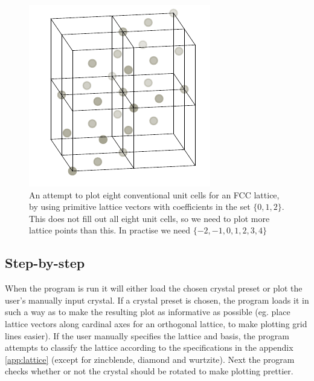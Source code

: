 \documentclass[main.tex]{subfiles}
\begin{document}
	\begin{figure}
		\begin{center}
			\includegraphics[width=\linewidth]{figures/lattice_unfinished_2.pdf}
		\end{center}
		\caption{An attempt to plot eight conventional unit cells for an FCC lattice, by using primitive lattice vectors with coefficients in the set $ \{0, 1, 2\} $. This does not fill out all eight unit cells, so we need to plot more lattice points than this. In practise we need $ \{-2, -1, 0, 1, 2, 3, 4\} $}
		\label{fig:lattice_unfinished_2}
	\end{figure}
	
	
	\subsection{Step-by-step}
	When the program is run it will either load the chosen crystal preset or plot the user's manually input crystal. If a crystal preset is chosen, the program loads it in such a way as to make the resulting plot as informative as possible (eg. place lattice vectors along cardinal axes for an orthogonal lattice, to make plotting grid lines easier). If the user manually specifies the lattice and basis, the program attempts to classify the lattice according to the specifications in the appendix \ref{app:lattice} (except for zincblende, diamond and wurtzite). Next the program checks whether or not the crystal should be rotated to make plotting prettier.
	
\end{document}

